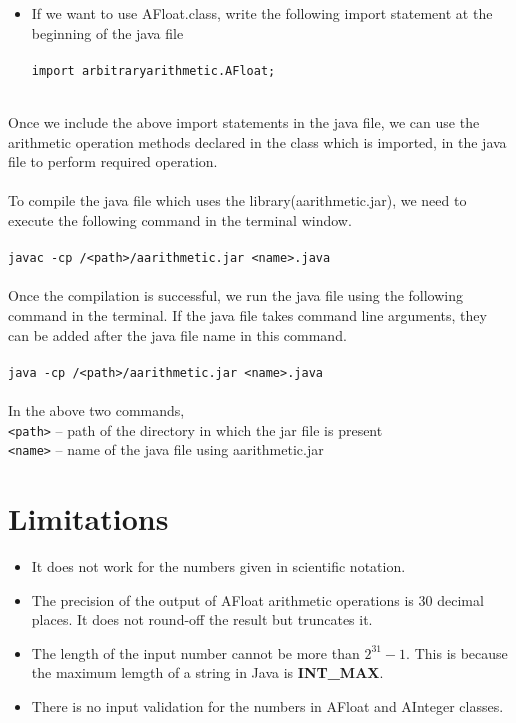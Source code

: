 \documentclass[a4paper,12pt]{article}
\begin{document}
{\begin{itemize}
    \item If we want to use AFloat.class, write the following import statement at the beginning of the java file\\\\
    \texttt{import arbitraryarithmetic.AFloat;}\\\\
\end{itemize}
Once we include the above import statements in the java file, we can use the arithmetic operation methods declared in the class which is imported, in the java file to perform required operation.\\\\
To compile the java file which uses the library(aarithmetic.jar), we need to execute the following command in the terminal window.\\\\
\texttt{javac -cp /<path>/aarithmetic.jar <name>.java}\\\\
Once the compilation is successful, we run the java file using the following command in the terminal. If the java file takes command line arguments, they can be added after the java file name in this command.\\\\
\texttt{java -cp /<path>/aarithmetic.jar <name>.java}\\\\
In the above two commands,\\
\texttt{<path>} -- path of the directory in which the jar file is present\\
\texttt{<name>} -- name of the java file using aarithmetic.jar

\section{Limitations}
\begin{itemize}
    \item It does not work for the numbers given in scientific notation.
    \item The precision of the output of AFloat arithmetic operations is 30 decimal places. It does not round-off the result but truncates it.
    \item The length of the input number cannot be more than $2^{31} -1$. This is because the maximum lemgth of a string in Java is \textbf{INT\_MAX}.
    \item There is no input validation for the numbers in AFloat and AInteger classes.
\end{itemize}

}
\end{document}
